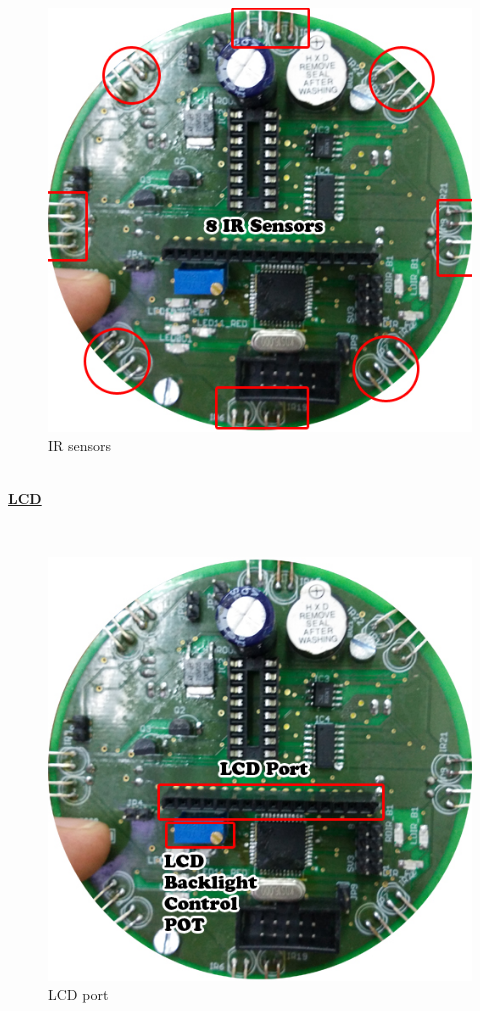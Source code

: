 \documentclass[a4paper,12pt,oneside]{book}
\begin{document}
	\hfill\\
	\begin{figure}[h!]
		\caption{IR sensors}
		\includegraphics[width=\textwidth]{./HardwareManual/IR_Sensor.jpg}
	\end{figure}	
	\hfill\\
	
	\underline{\textbf{\Large{LCD}}}
		
	\hfill\\
	\begin{figure}[h!]
		\caption{LCD port}
		\includegraphics[width=\textwidth]{./HardwareManual/lcd1.jpg}
	\end{figure}	
	\hfill\\
	
\end{document}
